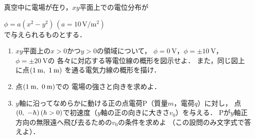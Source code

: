﻿\documentclass[../../../ps_q.tex]{subfiles}
\begin{document}
    真空中に電場が在り，$xy$平面上での電位分布が

    \myspaceb%
    $\displaystyle%
        \phi=a(x^2-y^2)\,(a=10\,\mathrm{V}/\mathrm{m}^2)%
    $\\
    で与えられるものとする．
    
    \begin{enumerate}
        \item%
            $xy$平面上の$x>0$かつ$y>0$の領域について，%
            $\phi=0\:\mathrm{V}$，$\phi=\pm10\:\mathrm{V}$，$\phi=\pm20\:\mathrm{V}$の%
            各々に対応する等電位線の概形を図示せよ．%
            また，同じ図上に点$(1\:\mathrm{m}, \hspace{3.4pt} 1\:\mathrm{m})$%
            を通る電気力線の概形を描け．
        \item%
            点$(1\:\mathrm{m}, \hspace{3.4pt} 0\:\mathrm{m})$での%
            電場の強さと向きを求めよ．
        \item%
            $y$軸に沿ってなめらかに動ける正の点電荷P（質量$m$，電荷$q$）に対し，%
            点$(0, \hspace{3.4pt} -h)\,(h>0)$で初速度（$y$軸の正の向きに大きさ$v_0$）を与える．%
            Pが$y$軸正方向の無限遠へ飛び去るための$v_0$の条件を求めよ%
            （この設問のみ文字式で答えよ）．
    \end{enumerate}
\end{document}
